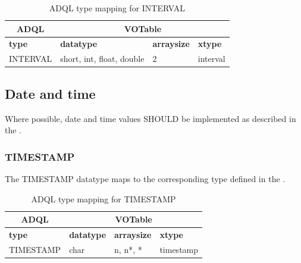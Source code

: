 \documentclass[11pt,a4paper]{ivoa}
\begin{document}
\begin{table}[th]\footnotesize
    \begin{tabular}
        {|p{}|p{}|p{}|p{}|}
        \hline

        \hline
        \multicolumn{1}{|c|}{\textbf{ADQL}} &
        \multicolumn{3}{|c|}{\textbf{VOTable}}
        \tabularnewline
        
        \hline
        \textbf{type} &
        \textbf{datatype} &
        \textbf{arraysize} &
        \textbf{xtype}
        \tabularnewline

        \hline
        INTERVAL &
        short, int, float, double &
        2 &
        interval
        \tabularnewline
        \hline
    \end{tabular}
    \caption{ADQL type mapping for INTERVAL}
    \label{table:types.numeric.interval}
\end{table}

\subsection{Date and time}
\label{sec:types.datetime}

Where possible, date and time values SHOULD be implemented as
described in the \DALISpec.

\subsubsection{TIMESTAMP}
\label{sec:types.datetime.timestamp}

The TIMESTAMP datatype maps to the corresponding type defined in the
\DALISpec.

\begin{table}[th]\footnotesize
    \begin{tabular}
        {|p{}|p{}|p{}|p{}|}
        \hline

        \hline
        \multicolumn{1}{|c|}{\textbf{ADQL}} &
        \multicolumn{3}{|c|}{\textbf{VOTable}}
        \tabularnewline
        
        \hline
        \textbf{type} &
        \textbf{datatype} &
        \textbf{arraysize} &
        \textbf{xtype}
        \tabularnewline

        \hline
        TIMESTAMP &
        char &
        n, n*, * &
        timestamp
        \tabularnewline
        \hline
    \end{tabular}
    \caption{ADQL type mapping for TIMESTAMP}
    \label{table:types.datetime.timestamp}
\end{table}
\end{document}
